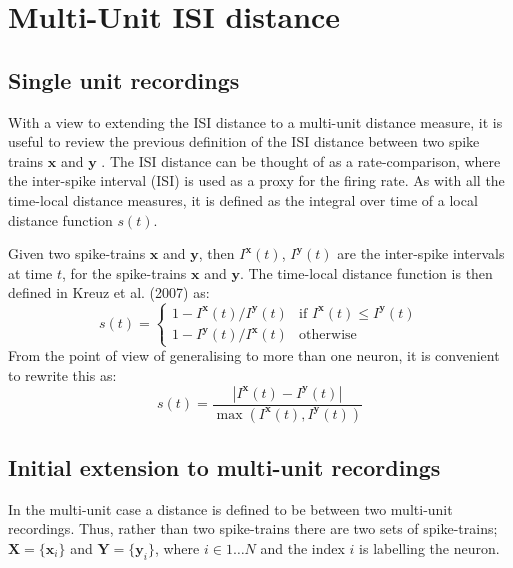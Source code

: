 \newpage

\newpage

\section{Multi-Unit ISI distance}

\subsection{Single unit recordings}

With a view to extending the ISI distance to a multi-unit distance measure, it is useful to review the previous definition of the ISI distance between two spike trains $\mathbf{x}$ and $\mathbf{y}$ .  The ISI distance can be thought of as a rate-comparison, where the inter-spike interval (ISI) is used as a proxy for the firing rate.  As with all the time-local distance measures, it is defined as the integral over time of a local distance function $s(t)$.

Given two spike-trains $\mathbf{x}$ and $\mathbf{y}$, then $I^{\mathbf{x}}(t)$, $I^{\mathbf{y}}(t)$ are the inter-spike intervals at time $t$, for the spike-trains $\mathbf{x}$ and $\mathbf{y}$.  The time-local distance function is then defined in Kreuz et al. (2007) as:
\begin{equation}
s(t) = \left\{ \begin{array}{ll} 1-I^{\mathbf{x}}(t) / I^{\mathbf{y}}(t)  & \text{if } I^{\mathbf{x}}(t) \leq I^{\mathbf{y}}(t) \\ 1- I^{\mathbf{y}}(t) / I^{\mathbf{x}}(t)  & \text{otherwise} \end{array} \right.
\end{equation}
From the point of view of generalising to more than one neuron, it is convenient to rewrite this as:
\begin{equation}
s(t) = \frac{ | I^{\mathbf{x}}(t) - I^{\mathbf{y}}(t) | }{\max (I^{\mathbf{x}}(t), I^{\mathbf{y}}(t)) }
\end{equation}

\subsection{Initial extension to multi-unit recordings}

In the multi-unit case a distance is defined to be between two multi-unit recordings.  Thus, rather than two spike-trains there are two sets of spike-trains; $\mathbf{X}=\{ \mathbf{x}_i \}$ and $ \mathbf{Y}=\{ \mathbf{y}_i \}$, where $i \in 1\ldots N$ and the index $i$ is labelling the neuron.

